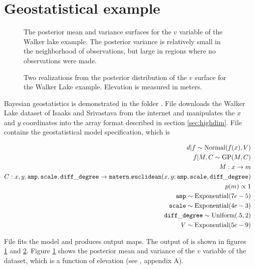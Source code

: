 \section{Geostatistical example}\label{sub:geostat}
\begin{figure}
    \centering
    \caption{The posterior mean and variance surfaces for the $v$ variable of the Walker lake example. The posterior variance is relatively small in the neighborhood of observations, but large in regions where no observations were made.}
    \label{fig:walker}
\end{figure}
\begin{figure}
    \centering
    \caption{Two realizations from the posterior distribution of the $v$ surface for the Walker Lake example. Elevation is measured in meters.}
    \label{fig:walkerreal}
\end{figure}
Bayesian geostatistics is demonstrated in the folder . File  downloads the Walker Lake dataset of Isaaks and Srivastava \citep{isaaks} from the internet and manipulates the $x$ and $y$ coordinates into the array format described in section \ref{sec:highdim}. File  contains the geostatistical model specification, which is

\begin{eqnarray*}
    d|f \sim \textup{Normal}(f(x),V)\\
    f|M,C \sim \textup{GP}(M,C) \\
    M:x\rightarrow m\\
    C:x,y,\mathtt{amp},\mathtt{scale},\mathtt{diff\_degree}\rightarrow \mathtt{matern.euclidean}(x,y;\mathtt{amp},\mathtt{scale},\mathtt{diff\_degree})\\
    p(m)\propto 1\\
    \mathtt{amp}\sim \textup{Exponential}(7e-5) \\
    \mathtt{scale}\sim \textup{Exponential}(4e-3) \\
    \mathtt{diff\_degree}\sim \textup{Uniform}(.5,2)\\ 
    V\sim \textup{Exponential}(5e-9)\\
\end{eqnarray*}

File  fits the model and produces output maps.  The output of  is shown in figures \ref{fig:walker} and \ref{fig:walkerreal}. Figure \ref{fig:walker} shows the posterior mean and variance of the $v$ variable of the dataset, which is a function of elevation (see \cite{isaaks}, appendix A).